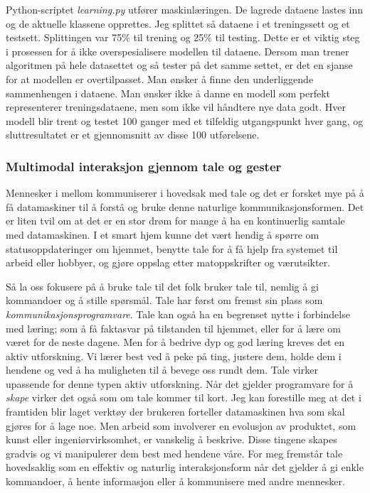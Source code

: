 Python-scriptet \emph{learning.py} utfører maskinlæringen. De lagrede dataene  lastes inn og de aktuelle klassene opprettes. Jeg splittet så dataene i et treningssett og et testsett. Splittingen var 75\% til trening og 25\% til testing. Dette er et viktig steg i prosessen for å ikke overspesialisere modellen til dataene. Dersom man trener algoritmen på hele datasettet og så tester på det samme settet, er det en sjanse for at modellen er overtilpasset. Man ønsker å finne den underliggende sammenhengen i dataene. Man ønsker ikke å danne en modell som perfekt representerer treningsdataene, men som ikke vil håndtere nye data godt. Hver modell blir trent og testet 100 ganger med et tilfeldig utgangspunkt hver gang, og sluttresultatet er et gjennomsnitt av disse 100 utførelsene.

\subsubsection*{Multimodal interaksjon gjennom tale og gester}
Mennesker i mellom kommuniserer i hovedsak med tale og det er forsket mye på å få datamaskiner til å forstå og bruke denne naturlige kommunikasjonsformen. Det er liten tvil om at det er en stor drøm for mange å ha en kontinuerlig samtale med datamaskinen. I et smart hjem kunne det vært hendig å spørre om statusoppdateringer om hjemmet, benytte tale for å få hjelp fra systemet til arbeid eller hobbyer, og gjøre oppslag etter matoppskrifter og værutsikter.

Så la oss fokusere på å bruke tale til det folk bruker tale til, nemlig å gi kommandoer og å stille spørsmål. Tale har først om fremst sin plass som \emph{kommunikasjonsprogramvare}. Tale kan også ha en begrenset nytte i forbindelse med læring; som å få faktasvar på tilstanden til hjemmet, eller for å lære om været for de neste dagene. Men for å bedrive dyp og god læring kreves det en aktiv utforskning. Vi lærer best ved å peke på ting, justere dem, holde dem i hendene og ved å ha muligheten til å bevege oss rundt dem. Tale virker upassende for denne typen aktiv utforskning. Når det gjelder programvare for å \emph{skape} virker det også som om tale kommer til kort. Jeg kan forestille meg at det i framtiden blir laget verktøy der brukeren forteller datamaskinen hva som skal gjøres for å lage noe. Men arbeid som involverer en evolusjon av produktet, som kunst eller ingeniørvirksomhet, er vanskelig å beskrive. Disse tingene skapes gradvis og vi manipulerer dem best med hendene våre. For meg fremstår tale hovedsaklig som en effektiv og naturlig interaksjonsform når det gjelder å gi enkle kommandoer, å hente informasjon eller å kommunisere med andre mennesker.

